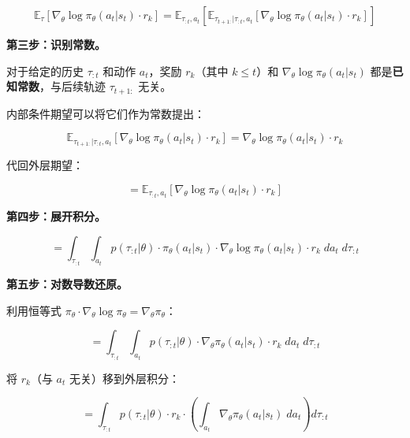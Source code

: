 \documentclass[12pt,a4paper]{article}
\newcommand{\E}{\mathbb{E}}
\newcommand{\grad}{\nabla}
\theoremstyle{noteplain}
\theoremstyle{noteexercise}
\begin{document}
\begin{equation}\label{eq:total-exp}
  \E_\tau[\grad_\theta \log \pi_\theta(a_t|s_t) \cdot r_k]
  = \E_{\tau_{:t},a_t}\!\left[
    \E_{\tau_{t+1:}|\tau_{:t},a_t}\!
    \left[ \grad_\theta \log \pi_\theta(a_t|s_t) \cdot r_k \right]
  \right]
\end{equation}

\textbf{第三步：识别常数。}

对于给定的历史 $\tau_{:t}$ 和动作 $a_t$，奖励 $r_k$（其中 $k \le t$）和 $\grad_\theta \log \pi_\theta(a_t|s_t)$ 都是\textbf{已知常数}，与后续轨迹 $\tau_{t+1:}$ 无关。

内部条件期望可以将它们作为常数提出：

\begin{equation}\label{eq:inner-exp}
  \E_{\tau_{t+1:}|\tau_{:t},a_t}\!
  \left[ \grad_\theta \log \pi_\theta(a_t|s_t) \cdot r_k \right]
  = \grad_\theta \log \pi_\theta(a_t|s_t) \cdot r_k
\end{equation}

代回外层期望：

\begin{equation}\label{eq:outer-exp}
  = \E_{\tau_{:t},a_t}\!\left[ \grad_\theta \log \pi_\theta(a_t|s_t) \cdot r_k \right]
\end{equation}

\textbf{第四步：展开积分。}

\begin{equation}\label{eq:expand-int}
  = \int_{\tau_{:t}}\!\int_{a_t}
  p(\tau_{:t}|\theta) \cdot \pi_\theta(a_t|s_t) \cdot \grad_\theta \log \pi_\theta(a_t|s_t) \cdot r_k
  \; da_t \; d\tau_{:t}
\end{equation}

\textbf{第五步：对数导数还原。}

利用恒等式 $\pi_\theta \cdot \grad_\theta \log \pi_\theta = \grad_\theta \pi_\theta$：

\begin{equation}\label{eq:log-restore}
  = \int_{\tau_{:t}}\!\int_{a_t}
  p(\tau_{:t}|\theta) \cdot \grad_\theta \pi_\theta(a_t|s_t) \cdot r_k
  \; da_t \; d\tau_{:t}
\end{equation}

将 $r_k$（与 $a_t$ 无关）移到外层积分：

\begin{equation}\label{eq:move-out}
  = \int_{\tau_{:t}} p(\tau_{:t}|\theta) \cdot r_k \cdot
  \left( \int_{a_t} \grad_\theta \pi_\theta(a_t|s_t) \; da_t \right)
  d\tau_{:t}
\end{equation}
\end{document}
